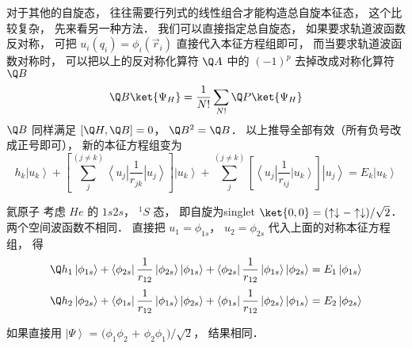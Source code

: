 对于其他的自旋态， 往往需要行列式的线性组合才能构造总自旋本征态， 这个比较复杂， 先来看另一种方法． 我们可以直接指定总自旋态， 如果要求轨道波函数反对称， 可把 ${u_i}({q_i}) = {\phi_i}({\vec r_i})$ 直接代入本征方程组即可， 而当要求轨道波函数对称时， 可以把以上的反对称化算符 $\Q A$ 中的 ${( - 1)^p}$ 去掉改成对称化算符 $\Q B$ 
 \begin{equation}
\Q B \ket{\Psi_H}  = \frac{1}{N!}\sum\limits_{N!} {\Q P\ket{\Psi_H} } 
\end{equation}
 $\Q B$ 同样满足 $[\Q H,\Q B] = 0$，  ${\Q B^2} = \Q B$．  以上推导全部有效（所有负号改成正号即可）， 新的本征方程组变为
 \begin{equation}
{h_k}\left| {u_k} \right\rangle  + \left[ {\sum\limits_j^{(j \ne k)} {\left\langle {u_j} \right|\frac{1}{r_{jk}}\left| {u_j} \right\rangle } } \right]\left| {u_k} \right\rangle  + \sum\limits_j^{(j \ne k)} {\left[ {\left\langle {u_j} \right|\frac{1}{r_{ij}}\left| {u_k} \right\rangle } \right]\left| {u_j} \right\rangle }  = {E_k}\left| {u_k} \right\rangle 
\end{equation}

\begin{exam}{氦原子}
考虑 $He$ 的 $1s2s$，  $^1S$ 态， 即自旋为singlet $\ket{0,0}  = ( \uparrow  \downarrow  -  \uparrow  \downarrow )/\sqrt 2 $．  两个空间波函数不相同． 直接把 ${u_1} = {\phi_{1s}}$，  ${u_2} = {\phi_{2s}}$ 代入上面的对称本征方程组， 得
 \begin{equation}
{\Q h_1}\left| {\phi_{1s}} \right\rangle  + \left\langle {\phi_{2s}} \right|\frac{1}{r_{12}}\left| {\phi_{2s}} \right\rangle \left| {\phi_{1s}} \right\rangle  + \left\langle {\phi_{2s}} \right|\frac{1}{r_{12}}\left| {\phi_{1s}} \right\rangle \left| {\phi_{2s}} \right\rangle  = {E_1}\left| {\phi_{1s}} \right\rangle 
\end{equation}
\begin{equation}
{\Q h_2}\left| {\phi_{2s}} \right\rangle  + \left\langle {\phi_{1s}} \right|\frac{1}{r_{12}}\left| {\phi_{1s}} \right\rangle \left| {\phi_{2s}} \right\rangle  + \left\langle {\phi_{1s}} \right|\frac{1}{r_{12}}\left| {\phi_{2s}} \right\rangle \left| {\phi_{1s}} \right\rangle  = {E_2}\left| {\phi_{2s}} \right\rangle 
\end{equation}
 
如果直接用 $\left| \Psi  \right\rangle {\text{ = (}}{\phi_1}{\phi_2}{\text{ + }}{\phi_2}{\phi_1}{\text{)/}}\sqrt 2 $，  结果相同．
\end{exam}
 
